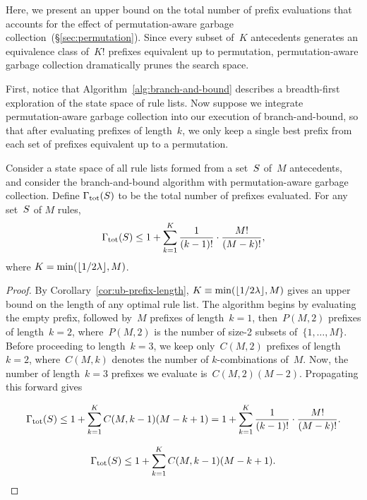 Here, we present an upper bound on the total number of prefix
evaluations that accounts for the effect of permutation-aware
garbage collection~(\S\ref{sec:permutation}).
%
Since every subset of~$K$ antecedents generates an equivalence
class of~$K!$ prefixes equivalent up to permutation, permutation-aware
garbage collection dramatically prunes the search space.

First, notice that Algorithm~\ref{alg:branch-and-bound} describes a
breadth-first exploration of the state space of rule lists.
%
Now suppose we integrate permutation-aware garbage collection into
our execution of branch-and-bound, so that after evaluating
prefixes of length~$k$, we only keep a single best prefix
from each set of prefixes equivalent up to a permutation.

\begin{theorem}
%
Consider a state space of all rule lists formed from a set~$S$
of~$M$ antecedents, and consider the branch-and-bound algorithm with
permutation-aware garbage collection.
%
Define ${\Gamma_{\textnormal{tot}}}(S)$ to be the total number of prefixes evaluated.
%
For any set~$S$ of $M$ rules,
\begin{align}
\TotalRemaining(\RuleSet)
\le  1 + \sum_{k=1}^K \frac{1}{(k - 1)!} \cdot \frac{M!}{(M - k)!},
\end{align}
where ${K = \min(\lfloor 1 / 2 {\lambda} \rfloor, M)}$.
\end{theorem}

\begin{proof}
By Corollary~\ref{cor:ub-prefix-length},
${K \equiv \min(\lfloor 1 / 2 {\lambda} \rfloor, M)}$
gives an upper bound on the length of any optimal rule list.
%
The algorithm begins by evaluating the empty prefix,
followed by~$M$ prefixes of length~${k=1}$,
then~${P(M, 2)}$ prefixes of length~${k=2}$,
where~${P(M, 2)}$ is the number of size-2 subsets of~$\{1, \dots, M \}$.
%
Before proceeding to length~${k=3}$, we keep only~${C(M, 2)}$
prefixes of length~${k=2}$, where~${C(M, k)}$ denotes the
number of $k$-combinations of~$M$.
%
Now, the number of length~${k=3}$ prefixes we evaluate is~${C(M, 2) (M - 2)}$.
%
Propagating this forward gives
\begin{arxiv}
\begin{align}
\TotalRemaining(\RuleSet) \le 1 + \sum_{k=1}^K C(M, k-1) (M - k + 1)
= 1 + \sum_{k=1}^K \frac{1}{(k - 1)!} \cdot \frac{M!}{(M - k)!}.
\end{align}
\end{arxiv}
\begin{align}
\TotalRemaining(\RuleSet) \le 1 + \sum_{k=1}^K C(M, k-1) (M - k + 1).
\end{align}
\end{proof}

